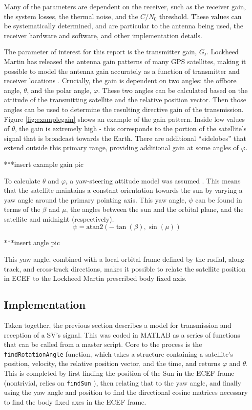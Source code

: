 \documentclass[11pt]{article}
\newcommand{\cnr}{C/N_0}
\begin{document}
Many of the parameters are dependent on the receiver, such as the receiver gain, the system losses, the thermal noise, and the $\cnr$ threshold. These values can be systematically determined, and are particular to the antenna being used, the receiver hardware and software, and other implementation details.

The parameter of interest for this report is the transmitter gain, $G_t$. Lockheed Martin has released the antenna gain patterns of many GPS satellites, making it possible to model the antenna gain accurately as a function of transmitter and receiver locations \cite{lockheed}. Crucially, the gain is dependent on two angles: the offbore angle, $\theta$, and the polar angle, $\varphi$. These two angles can be calculated based on the attitude of the transmitting satellite and the relative position vector. Then those angles can be used to determine the resulting directive gain of the transmission. Figure \ref{fig:examplegain} shows an example of the gain pattern. Inside low values of $\theta$, the gain is extremely high - this corresponds to the portion of the satellite's signal that is broadcast towards the Earth. There are additional ``sidelobes'' that extend outside this primary range, providing additional gain at some angles of $\varphi$.

***insert example gain pic

To calculate $\theta$ and $\varphi$, a yaw-steering attitude model was assumed \cite{orient}. This means that the satellite maintains a constant orientation towards the sun by varying a yaw angle around the primary pointing axis. This yaw angle, $\psi$ can be found in terms of the $\beta$ and $\mu$, the angles between the sun and the orbital plane, and the satellite and midnight (respectively).
\begin{equation}
\psi = \text{atan2}(-\tan(\beta),\sin(\mu))
\label{eq:yaw}
\end{equation}

***insert angle pic

This yaw angle, combined with a local orbital frame defined by the radial, along-track, and cross-track directions, makes it possible to relate the satellite position in ECEF to the Lockheed Martin prescribed body fixed axis. 

\subsection{Implementation}
Taken together, the previous section describes a model for transmission and reception of a SV's signal. This was coded in MATLAB as a series of functions that can be called from a master script. Core to the process is the \verb|findRotationAngle| function, which takes a structure containing a satellite's position, velocity, the relative position vector, and the time, and returns $\varphi$ and $\theta$. This is completed by first finding the position of the Sun in the ECEF frame (nontrivial, relies on \verb|findSun| \cite{astro}), then relating that to the yaw angle, and finally using the yaw angle and position to find the directional cosine matrices necessary to find the body fixed axes in the ECEF frame.
\end{document}

